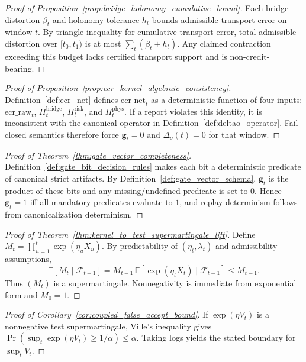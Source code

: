 \documentclass[11pt]{article}
\theoremstyle{definition}
\theoremstyle{plain}
\newcommand{\Expect}{\mathbb{E}}
\newcommand{\deltao}{\Delta_o}
\newcommand{\PiRisk}{\Pi^{\mathrm{risk}}}
\newcommand{\PiBridge}{\Pi^{\mathrm{bridge}}}
\newcommand{\PiPhys}{\Pi^{\mathrm{phys}}}
\newcommand{\Vcouple}{V}
\begin{document}
\begin{proof}[Proof of Proposition~\ref{prop:bridge_holonomy_cumulative_bound}]
Each bridge distortion $\beta_t$ and holonomy tolerance $h_t$ bounds admissible transport error on window $t$.
By triangle inequality for cumulative transport error, total admissible distortion over $[t_0,t_1)$ is at most $\sum_t(\beta_t+h_t)$.
Any claimed contraction exceeding this budget lacks certified transport support and is non-credit-bearing.
\end{proof}

\begin{proof}[Proof of Proposition~\ref{prop:ecr_kernel_algebraic_consistency}]
Definition~\ref{def:ecr_net} defines $\mathrm{ecr\_net}_t$ as a deterministic function of four inputs:
$\mathrm{ecr\_raw}_t$, $\PiBridge_t$, $\PiRisk_t$, and $\PiPhys_t$.
If a report violates this identity, it is inconsistent with the canonical operator in Definition~\ref{def:deltao_operator}.
Fail-closed semantics therefore force $\mathbf g_t=0$ and $\deltao(t)=0$ for that window.
\end{proof}

\begin{proof}[Proof of Theorem~\ref{thm:gate_vector_completeness}]
Definition~\ref{def:gate_bit_decision_rules} makes each bit a deterministic predicate of canonical strict artifacts.
By Definition~\ref{def:gate_vector_schema}, $\mathbf g_t$ is the product of these bits and any missing/undefined predicate is set to $0$.
Hence $\mathbf g_t=1$ iff all mandatory predicates evaluate to $1$, and replay determinism follows from canonicalization determinism.
\end{proof}

\begin{proof}[Proof of Theorem~\ref{thm:kernel_to_test_supermartingale_lift}]
Define $M_t=\prod_{u=1}^{t}\exp(\eta_u X_u)$.
By predictability of $(\eta_t,\lambda_t)$ and admissibility assumptions,
\[
\Expect[M_t\mid \mathcal{F}_{t-1}]
=
M_{t-1}\,\Expect[\exp(\eta_t X_t)\mid \mathcal{F}_{t-1}]
\le
M_{t-1}.
\]
Thus $(M_t)$ is a supermartingale.
Nonnegativity is immediate from exponential form and $M_0=1$.
\end{proof}

\begin{proof}[Proof of Corollary~\ref{cor:coupled_false_accept_bound}]
If $\exp(\eta\Vcouple_t)$ is a nonnegative test supermartingale, Ville's inequality gives
$\Pr(\sup_t \exp(\eta\Vcouple_t)\ge 1/\alpha)\le \alpha$.
Taking logs yields the stated boundary for $\sup_t \Vcouple_t$.
\end{proof}
\end{document}
